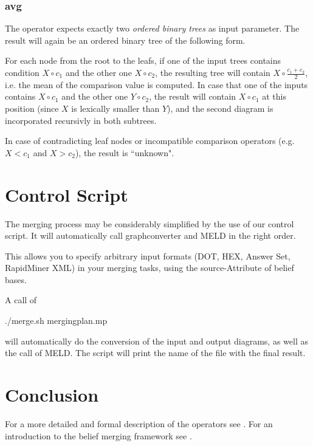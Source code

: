 \documentclass[a4paper,11pt]{article}
\theoremstyle{definition}
\newcommand{\inlinecode}[1]{\textsf{#1}\xspace }
\begin{document}
			\subsubsection{avg}

				The operator expects exactly two \emph{ordered binary trees} as input parameter. The result will again be an ordered binary tree of the following form.
				
				For each node from the root to the leafs, if one of the input trees contains condition $X \circ c_1$ and the other one $X \circ c_2$, the resulting tree will contain
				$X \circ \frac{c_1 + c_2}{2}$, i.e. the mean of the comparison value is computed. In case that one of the inputs contains $X \circ c_1$ and the other one $Y \circ c_2$, the
				result will contain $X \circ c_1$ at this position (since $X$ is lexically smaller than $Y$), and the second diagram is incorporated recursivly in both subtrees.
				
				In case of contradicting leaf nodes or incompatible comparison operators (e.g. $X < c_1$ and $X > c_2$), the result is ``unknown".

	\section{Control Script}
	\label{sec:ControlScript}

		The merging process may be considerably simplified by the use of our control script. It will automatically call graphconverter and MELD in the right order.
		
		This allows you to specify arbitrary input formats (DOT, HEX, Answer Set, RapidMiner XML) in your merging tasks, using the source-Attribute of belief bases.

		A call of

		\begin{center}
			\inlinecode{./merge.sh mergingplan.mp}
		\end{center}

		will automatically do the conversion of the input and output diagrams, as well as the call of MELD. The script will print the name of the file with the final result. 

	\section{Conclusion}
	\label{sec:Conclusion}

		For a more detailed and formal description of the operators see \cite{CR10DD}. For an introduction to the belief merging framework see \cite{CR10BMF}.

	
	
\end{document}
